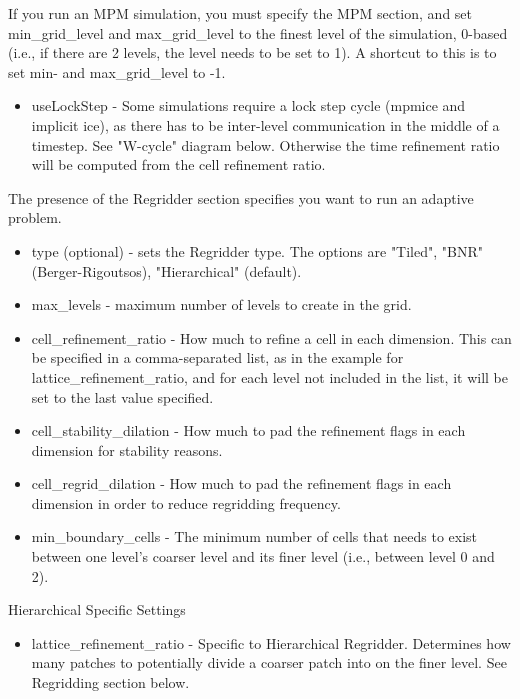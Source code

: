 If you run an MPM simulation, you must specify the MPM section, and
set min\_grid\_level and max\_grid\_level to the finest level of the
simulation, 0-based (i.e., if there are 2 levels, the level needs to
be set to 1). A shortcut to this is to set min- and max\_grid\_level to
-1.

\begin{itemize}
\item useLockStep - Some simulations require a lock step cycle (mpmice
  and implicit ice), as there has to be inter-level communication in
  the middle of a timestep. See "W-cycle" diagram below. Otherwise the
  time refinement ratio will be computed from the cell refinement
  ratio.
\end{itemize}


The presence of the Regridder section specifies you want to run an
adaptive problem.
\begin{itemize}
\item type (optional) - sets the Regridder type. The options are
  "Tiled", "BNR" (Berger-Rigoutsos), "Hierarchical" (default).
 \item max\_levels - maximum number of levels to create in the grid. 
 \item cell\_refinement\_ratio - How much to refine a cell in each
   dimension. This can be specified in a comma-separated list, as in
   the example for lattice\_refinement\_ratio, and for each level not
   included in the list, it will be set to the last value specified.
 \item cell\_stability\_dilation - How much to pad the refinement flags
   in each dimension for stability reasons.
 \item cell\_regrid\_dilation - How much to pad the refinement flags in
   each dimension in order to reduce regridding frequency.
 \item min\_boundary\_cells - The minimum number of cells that needs to
   exist between one level's coarser level and its finer level (i.e.,
   between level 0 and 2).
\end{itemize}

Hierarchical Specific Settings

\begin{itemize}
\item lattice\_refinement\_ratio - Specific to Hierarchical
  Regridder. Determines how many patches to potentially divide a
  coarser patch into on the finer level. See Regridding section below.
\end{itemize}

